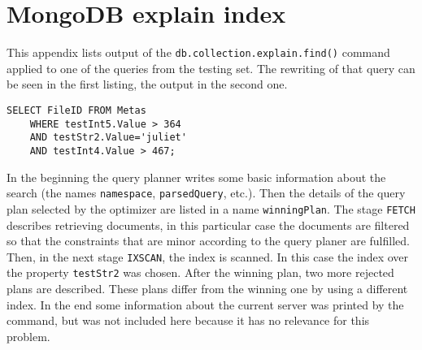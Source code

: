 \chapter{MongoDB explain index} \label{app:MDB}

This appendix lists output of the \texttt{db.collection.explain.find()} command applied to 
one of the queries from the testing set. The rewriting of that query can be seen in the first listing, the output
in the second one. 

\begin{verbatim}
SELECT FileID FROM Metas 
	WHERE testInt5.Value > 364 
	AND testStr2.Value='juliet' 
	AND testInt4.Value > 467;
\end{verbatim}

In the beginning the query planner writes some basic information about the search (the names \texttt{namespace},
\texttt{parsedQuery}, etc.). Then the details of the query plan selected by the optimizer are listed in a name
\texttt{winningPlan}. The stage \texttt{FETCH} describes retrieving documents, in this particular case the documents
are filtered so that the constraints that are minor according to the query planer are fulfilled. Then, in the next
stage \texttt{IXSCAN}, the index is scanned. In this case the index over the property \texttt{testStr2} was chosen.
After the winning plan, two more rejected plans are described. These plans differ from the winning one by using a 
different index. In the end some information about the current server was printed by the command, but was not
included here because it has no relevance for this problem.


